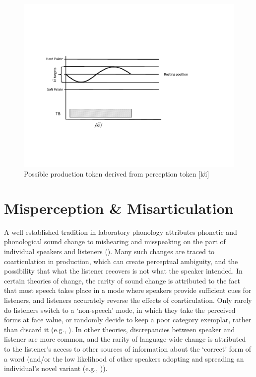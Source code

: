\begin{figure}[H]
\centering{}\includegraphics[width=\textwidth]{figures/palatalizationc.pdf}\caption{\label{fig:Palatalizationc}Possible production token derived from
perception token {[}{kʲi}{]}}
\end{figure}


\section{\label{subsec:Misperception-=000026-Misarticulation}Misperception
\& Misarticulation}

A well-established tradition in laboratory phonology attributes phonetic
and phonological sound change to mishearing and misspeaking on the
part of individual speakers and listeners (\citet{Ohala1980,Ohala1981,ohala1983origin,Ohala1990}).
Many such changes are traced to coarticulation in production, which
can create perceptual ambiguity, and the possibility that what the
listener recovers is not what the speaker intended. In certain theories
of change, the rarity of sound change is attributed to the fact that
most speech takes place in a mode where speakers provide sufficient
cues for listeners, and listeners accurately reverse the effects of
coarticulation. Only rarely do listeners switch to a `non-speech'
mode, in which they take the perceived forms at face value, or randomly
decide to keep a poor category exemplar, rather than discard it (e.g.,
\citealp{lindblom1990explaining,Garrett2013}). In other theories,
discrepancies between speaker and listener are more common, and the
rarity of language-wide change is attributed to the listener's access
to other sources of information about the `correct' form of a word
(and/or the low likelihood of other speakers adopting and spreading
an individual's novel variant (e.g., \citealt{Ohala1980})). 

